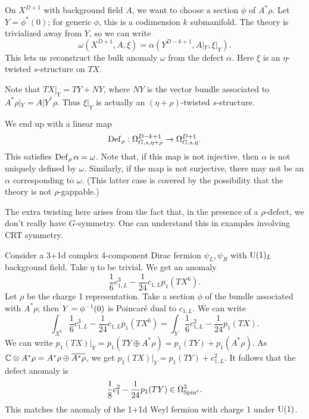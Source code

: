 On $X^{D+1}$ with background field $A$, we want to choose a section $\phi$ of $A^*\rho$.
Let $Y = \phi^*(0)$; for generic $\phi$, this is a codimension $k$ submanifold.
The theory is trivialized away from $Y$, so we can write
\[
	\omega(X^{D+1}, A, \xi) = \alpha(Y^{D-k+1}, A|_Y, \xi|_Y).
\]
This lets us reconstruct the bulk anomaly $\omega$ from the defect $\alpha$.
Here $\xi$ is an $\eta$-twisted $s$-structure on $TX$.

Note that $TX|_Y = TY + NY$, where $NY$ is the vector bundle associated to $A^*\rho|_Y = A|Y^* \rho$.
Thus $\xi|_Y$ is actually an $(\eta + \rho)$-twisted $s$-structure.

We end up with a linear map
\[
	\operatorname{Def}_\rho: \Omega^{D-k+1}_{G,s,\eta+\rho} \to \Omega^{D+1}_{G,s,\eta}.
\]
This satisfies $\operatorname{Def}_\rho \alpha = \omega$.
Note that, if this map is not injective, then $\alpha$ is not uniquely defined by $\omega$.
Similarly, if the map is not surjective, there may not be an $\alpha$ corresponding to $\omega$.
(This latter case is covered by the possibility that the theory is not $\rho$-gappable.)

The extra twisting here arises from the fact that, in the presence of a $\rho$-defect, we don't really have $G$-symmetry.
One can understand this in examples involving CRT symmetry.

\begin{ex}
	Consider a 3+1d complex 4-component Dirac fermion $\psi_L, \psi_R$ with $\mathrm{U}(1)_L$ background field.
	Take $\eta$ to be trivial.
	We get an anomaly
	\[
		\frac{1}{6} c_{1,L}^3 - \frac{1}{24} c_{1,L} p_1(TX^6).
	\]
	Let $\rho$ be the charge 1 representation.
	Take a section $\phi$ of the bundle associated with $A^* \rho$; then $Y = \phi^{-1}(0)$ is Poincar\'e dual to $c_{1,L}$.
	We can write
	\[
		\int_{X^6} \frac{1}{6} c_{1,L}^3 - \frac{1}{24} c_{1,L} p_1(TX^6) = \int_Y \frac{1}{6} c_{1,L}^2 - \frac{1}{24} p_1(TX).
	\]
	We can write $p_1(TX)|_Y = p_1(TY \oplus A^* \rho) = p_1(TY) + p_1(A^* \rho)$.
	As $\mathbb{C} \otimes A^* \rho = A^* \rho \oplus \overline{A^* \rho}$, we get $p_1(TX)|_Y = p_1(TY) + c_{1,L}^2$.
	It follows that the defect anomaly is
	\[
		\frac{1}{8} c_1^2 - \frac{1}{24} p_1(TY) \in \Omega^3_{\mathrm{Spin}^c}.
	\]
	This matches the anomaly of the 1+1d Weyl fermion with charge 1 under $\mathrm{U}(1)$.
\end{ex}
